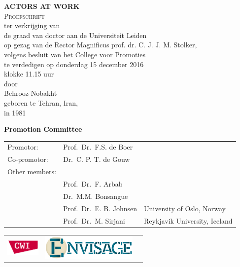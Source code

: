 \begin{titlepage}
\begin{center}
\par\vspace {3cm}
{\Large \uppercase{\textbf{Actors at Work}}}\\[7em]
{\Large \textsc{Proefschrift}\\[13em]}
{\large ter verkrijging van\\
de graad van doctor aan de Universiteit Leiden\\
op gezag van de Rector Magnificus prof. dr. C. J. J. M. Stolker,\\
volgens besluit van het College voor Promoties\\
te verdedigen       
op donderdag 15 december 2016\\
klokke 11.15 uur \\[7em]}
{\large door\\[7em]}
{\Large Behrooz Nobakht\\}    
{\large geboren te Tehran, Iran,\\
in 1981} %
\end{center}
\clearpage
\noindent%
\begin{flushleft}
{\Large\textbf{Promotion Committee}}\\[3em]
\end{flushleft}

\begin{tabular}{lll}
Promotor:    & Prof.\ Dr.\ F.S. de Boer & \\
Co-promotor: & Dr.\ C. P. T. de Gouw & \\[12pt]
Other members:\\
& Prof.\ Dr.\ F. Arbab & \\
& Dr.\ M.M. Bonsangue & \\
& Prof.\ Dr.\ E. B. Johnsen & University of Oslo, Norway\\
& Prof.\ Dr.\ M. Sirjani & Reykjavik University, Iceland\\
\end{tabular}

\vfill
\vspace{5.5cm}

\hspace{-0.5cm}
\begin{tabular}{lll}
\includegraphics[height=0.8cm]{figs/cwi.png} &
\includegraphics[height=1.2cm]{figs/envisage-logo} &
\end{tabular}


\end{titlepage}
